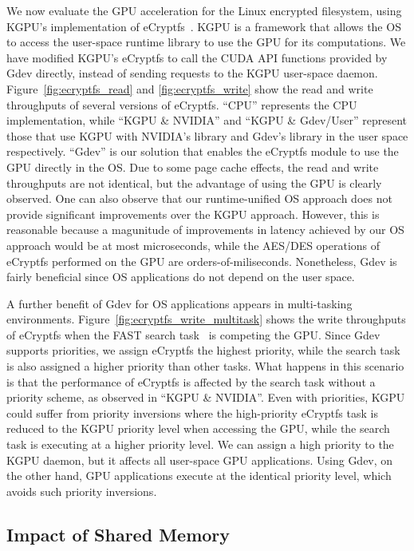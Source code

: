 We now evaluate the GPU acceleration for the Linux encrypted filesystem,
using KGPU's implementation of eCryptfs~\cite{Sun_SECURITY11_Poster}.
KGPU is a framework that allows the OS to access the user-space runtime
library to use the GPU for its computations.
We have modified KGPU's eCryptfs to call the CUDA API functions
provided by Gdev directly, instead of sending requests to the KGPU user-space
daemon.
Figure~\ref{fig:ecryptfs_read} and \ref{fig:ecryptfs_write} show the
read and write throughputs of several versions of eCryptfs.
``CPU'' represents the CPU implementation, while ``KGPU \& NVIDIA'' and
``KGPU \& Gdev/User'' represent those that use KGPU with NVIDIA's
library and Gdev's library in the user space respectively.
``Gdev'' is our solution that enables the eCryptfs module to use the GPU
directly in the OS.
Due to some page cache effects, the read and write throughputs are not
identical, but the advantage of using the GPU is clearly observed.
One can also observe that our runtime-unified OS approach does not
provide significant improvements over the KGPU approach.
However, this is reasonable because a magunitude of improvements in
latency achieved by our OS approach would be at most microseconds, while
the AES/DES operations of eCryptfs performed on the GPU are
orders-of-miliseconds.
Nonetheless, Gdev is fairly beneficial since OS applications do not
depend on the user space.

A further benefit of Gdev for OS applications appears in multi-tasking
environments.
Figure~\ref{fig:ecryptfs_write_multitask} shows the write throughputs of
eCryptfs when the FAST search task~\cite{Kim_SIGMOD10} is competing
the GPU.
Since Gdev supports priorities, we assign eCryptfs the highest priority,
while the search task is also assigned a higher priority than other tasks.
What happens in this scenario is that the performance of eCryptfs is
affected by the search task without a priority scheme, as observed in
``KGPU \& NVIDIA''.
Even with priorities, KGPU could suffer from priority inversions where
the high-priority eCryptfs task is reduced to the KGPU priority level
when accessing the GPU, while the search task is executing at a
higher priority level.
We can assign a high priority to the KGPU daemon, but it affects all
user-space GPU applications.
Using Gdev, on the other hand, GPU applications execute at the identical
priority level, which avoids such priority inversions.

\subsection{Impact of Shared Memory}

